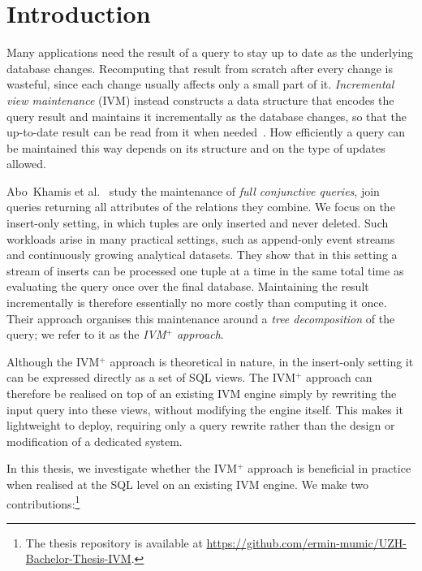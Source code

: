 \chapter{Introduction}
\label{ch:introduction}

Many applications need the result of a query to stay up to date as the underlying database changes.
Recomputing that result from scratch after every change is wasteful, since each change usually affects only a small part of it.
\emph{Incremental view maintenance} (IVM) instead constructs a data structure that encodes the query result and maintains it incrementally as the database changes, so that the up-to-date result can be read from it when needed~\cite{olteanu2024IVM}.
How efficiently a query can be maintained this way depends on its structure and on the type of updates allowed.

\medskip

Abo~Khamis et al.~\cite{abokhamis2024Insert-Only} study the maintenance of \emph{full conjunctive queries}, join queries returning all attributes of the relations they combine.
We focus on the insert-only setting, in which tuples are only inserted and never deleted.
Such workloads arise in many practical settings, such as append-only event streams and continuously growing analytical datasets.
They show that in this setting a stream of inserts can be processed one tuple at a time in the same total time as evaluating the query once over the final database.
Maintaining the result incrementally is therefore essentially no more costly than computing it once.
Their approach organises this maintenance around a \emph{tree decomposition} of the query; we refer to it as the \emph{IVM$^+$ approach}.

Although the IVM$^+$ approach is theoretical in nature, in the insert-only setting it can be expressed directly as a set of SQL views.
The IVM$^+$ approach can therefore be realised on top of an existing IVM engine simply by rewriting the input query into these views, without modifying the engine itself.
This makes it lightweight to deploy, requiring only a query rewrite rather than the design or modification of a dedicated system.

\medskip

In this thesis, we investigate whether the IVM$^+$ approach is beneficial in practice when realised at the SQL level on an existing IVM engine.
We make two contributions:\footnote{The thesis repository is available at \url{https://github.com/ermin-mumic/UZH-Bachelor-Thesis-IVM}.}

